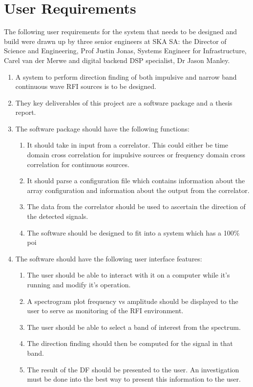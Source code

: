 \section{User Requirements}

The following user requirements for the system that needs to be designed and build were drawn up by three senior engineers at SKA SA: the Director of Science and Engineering, Prof Justin Jonas, Systems Engineer for Infrastructure, Carel van der Merwe and digital backend DSP specialist, Dr Jason Manley. 
\begin{enumerate}
  \item A system to perform direction finding of both impulsive and narrow band continuous wave RFI sources is to be designed.
  \item They key deliverables of this project are a software package and a thesis report.
  \item The software package should have the following functions:
    \begin{enumerate}
      \item It should take in input from a correlator. This could either be time domain cross correlation for impulsive sources or frequency domain cross correlation for continuous sources. 
      \item It should parse a configuration file which contains information about the array configuration and information about the output from the correlator.
      \item The data from the correlator should be used to ascertain the direction of the detected signals.
      \item The software should be designed to fit into a system which has a 100\% \gls{poi}
    \end{enumerate}
  \item The software should have the following user interface features:
    \begin{enumerate}
      \item The user should be able to interact with it on a computer while it's running and modify it's operation.
      \item A spectrogram plot frequency vs amplitude should be displayed to the user to serve as monitoring of the RFI environment.
      \item The user should be able to select a band of interest from the spectrum.
      \item The direction finding should then be computed for the signal in that band.
      \item The result of the DF should be presented to the user. An investigation must be done into the best way to present this information to the user.

\end{enumerate}
\end{enumerate}

